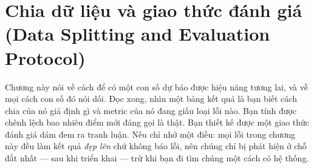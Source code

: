 \documentclass[../../deep_learning.tex]{subfiles}
\begin{document}
\chapter{Chia dữ liệu và giao thức đánh giá (Data Splitting and Evaluation Protocol)}

\begin{tomtat}
Chương này nói về cách để có một con số dự báo được hiệu năng tương lai, và về mọi cách con số đó nói dối. Đọc xong, nhìn một bảng kết quả là bạn biết cách chia của nó giả định gì và metric của nó đang giấu loại lỗi nào. Bạn tính được chênh lệch bao nhiêu điểm mới đáng gọi là thật. Bạn thiết kế được một giao thức đánh giá dám đem ra tranh luận. Nếu chỉ nhớ một điều: mọi lỗi trong chương này đều làm kết quả \emph{đẹp lên} chứ không báo lỗi, nên chúng chỉ bị phát hiện ở chỗ đắt nhất --- sau khi triển khai --- trừ khi bạn đi tìm chúng một cách có hệ thống.
\end{tomtat}
\end{document}
